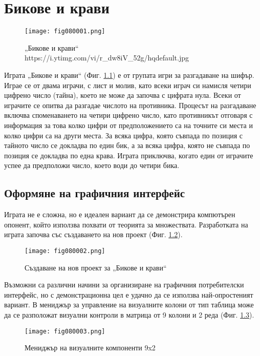 ﻿\chapter{Бикове и крави}

\begin{figure}[H]
  \centering
  \texttt{[image: fig080001.png]}
  \caption{„Бикове и крави“ \\ https://i.ytimg.com/vi/r\_dw8iV\_52g/hqdefault.jpg}
\label{fig080001}
\end{figure}

Играта „Бикове и крави“ (Фиг. \ref{fig080001}) е от групата игри за разгадаване на шифър. Играе се от двама играчи, с лист и молив, като всеки играч си намисля четири цифрено число (тайна), което не може да започва с цифрата нула. Всеки от играчите се опитва да разгадае числото на противника. Процесът на разгадаване включва споменаването на четири цифрено число, като противникът отговаря с информация за това колко цифри от предположението са на точните си места и колко цифри са на други места. За всяка цифра, която съвпада по позиция с тайното число се докладва по един бик, а за всяка цифра, която не съвпада по позиция се докладва по една крава. Играта приключва, когато един от играчите успее да предположи число, което води до четири бика. 

\section{Оформяне на графичния интерфейс}

Играта не е сложна, но е идеален вариант да се демонстрира компютърен опонент, който използва похвати от теорията за множествата. Разработката на играта започва със създаването на нов проект (Фиг. \ref{fig080002}).

\begin{figure}[H]
  \centering
  \texttt{[image: fig080002.png]}
  \caption{Създаване на нов проект за „Бикове и крави“}
\label{fig080002}
\end{figure}

Възможни са различни начини за организиране на графичния потребителски интерфейс, но с демонстрационна цел е удачно да се използва най-опростеният вариант. В мениджър за управление на визуалните колони от тип таблица може да се разположат визуални контроли в матрица от 9 колони и 2 реда (Фиг. \ref{fig080003}).

\begin{figure}[H]
  \centering
  \texttt{[image: fig080003.png]}
  \caption{Мениджър на визуалните компоненти 9x2}
\label{fig080003}
\end{figure}

